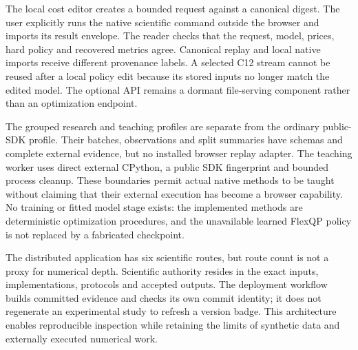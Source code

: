 The local cost editor creates a bounded request against a canonical digest.
The user explicitly runs the native scientific command outside the browser
and imports its result envelope. The reader checks that the request, model,
prices, hard policy and recovered metrics agree. Canonical replay and local
native imports receive different provenance labels. A selected C12 stream
cannot be reused after a local policy edit because its stored inputs no
longer match the edited model. The optional API remains a dormant file-serving
component rather than an optimization endpoint.

The grouped research and teaching profiles are separate from the ordinary
public-SDK profile. Their batches, observations and split summaries have
schemas and complete external evidence, but no installed browser replay
adapter. The teaching worker uses direct external CPython, a public SDK
fingerprint and bounded process cleanup. These boundaries permit actual
native methods to be taught without claiming that their external execution
has become a browser capability. No training or fitted model stage exists:
the implemented methods are deterministic optimization procedures, and the
unavailable learned FlexQP policy is not replaced by a fabricated checkpoint.

The distributed application has six scientific routes, but route count is
not a proxy for numerical depth. Scientific authority resides in the exact
inputs, implementations, protocols and accepted outputs. The deployment
workflow builds committed evidence and checks its own commit identity; it
does not regenerate an experimental study to refresh a version badge. This
architecture enables reproducible inspection while retaining the limits of
synthetic data and externally executed numerical work.
